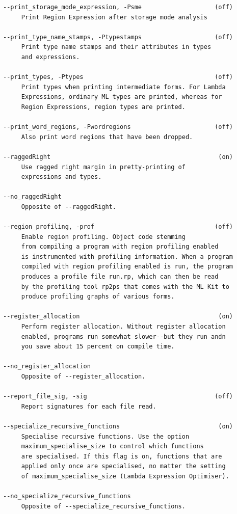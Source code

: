 \documentclass[12pt]{book}
\begin{document}
\begin{verbatim}
--print_storage_mode_expression, -Psme                    (off)
     Print Region Expression after storage mode analysis

--print_type_name_stamps, -Ptypestamps                    (off)
     Print type name stamps and their attributes in types
     and expressions.

--print_types, -Ptypes                                    (off)
     Print types when printing intermediate forms. For Lambda
     Expressions, ordinary ML types are printed, whereas for
     Region Expressions, region types are printed.

--print_word_regions, -Pwordregions                       (off)
     Also print word regions that have been dropped.

--raggedRight                                              (on)
     Use ragged right margin in pretty-printing of
     expressions and types.

--no_raggedRight
     Opposite of --raggedRight.

--region_profiling, -prof                                 (off)
     Enable region profiling. Object code stemming
     from compiling a program with region profiling enabled
     is instrumented with profiling information. When a program
     compiled with region profiling enabled is run, the program
     produces a profile file run.rp, which can then be read
     by the profiling tool rp2ps that comes with the ML Kit to
     produce profiling graphs of various forms.

--register_allocation                                      (on)
     Perform register allocation. Without register allocation
     enabled, programs run somewhat slower--but they run andn
     you save about 15 percent on compile time.

--no_register_allocation
     Opposite of --register_allocation.

--report_file_sig, -sig                                   (off)
     Report signatures for each file read.

--specialize_recursive_functions                           (on)
     Specialise recursive functions. Use the option
     maximum_specialise_size to control which functions
     are specialised. If this flag is on, functions that are
     applied only once are specialised, no matter the setting
     of maximum_specialise_size (Lambda Expression Optimiser).

--no_specialize_recursive_functions
     Opposite of --specialize_recursive_functions.


\end{verbatim}
\end{document}
